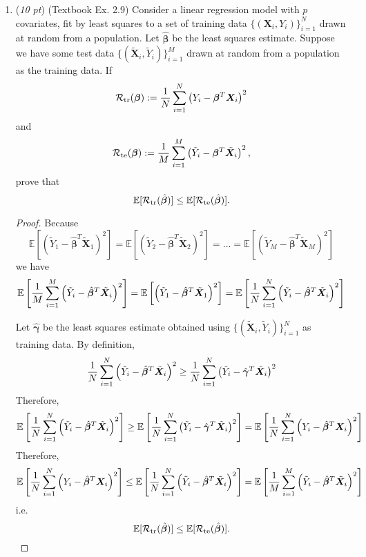 \documentclass[10pt]{article}
\theoremstyle{definition}
\theoremstyle{remark}
\newcommand{\bX}{\bm{X}}
\newcommand{\bbeta}{\bm{\beta}}
\newcommand{\bgamma}{\bm{\gamma}}
\newcommand{\bbE}{\mathbb{E}}
\newcommand{\cR}{\mathcal{R}}
\begin{document}
\begin{enumerate}
	\item (\textit{10 pt}) (Textbook Ex. 2.9) Consider a linear regression model with $ p $ covariates, fit by least squares to a set of training data $ \{ (\bX_{i},Y_{i}) \}_{i=1}^{N} $ drawn at random from a population. Let $ \hat{\bbeta} $ be the least squares estimate. Suppose we have some test data $ \{ (\tilde{\bX}_{i},\tilde{Y}_{i}) \}_{i=1}^{M} $ drawn at random from a population as the training data. If
	\[ \cR_{\rm tr}(\bbeta) := {1 \over N}\sum_{i=1}^{N}\left( Y_{i} - \bbeta^{T}\bX_{i} \right)^{2} \]
	and
	\[ \cR_{\rm te}(\bbeta) := {1 \over M}\sum_{i=1}^{M}\left( \tilde{Y}_{i} - \bbeta^{T}\tilde{\bX}_{i} \right)^{2}, \]
	prove that
	\[ \bbE[\cR_{\rm tr}(\hat{\bbeta})] \le \bbE [\cR_{\rm te}(\hat{\bbeta})]. \]
	
	\begin{proof}
	Because \[ \bbE\left[\left( \tilde{Y}_{1} - \hat{\bbeta}^{T}\tilde{\bX}_{1} \right)^{2}\right] = \bbE\left[\left( \tilde{Y}_{2} - \hat{\bbeta}^{T}\tilde{\bX}_{2} \right)^{2}\right] = \hdots = \bbE\left[\left( \tilde{Y}_{M} - \hat{\bbeta}^{T}\tilde{\bX}_{M} \right)^{2}\right] \]
	we have \[ \bbE\left[{1 \over M}\sum_{i=1}^{M}\left( \tilde{Y}_{i} - \hat{\bbeta}^{T}\tilde{\bX}_{i} \right)^{2}\right] = \bbE\left[\left( \tilde{Y}_{1} - \hat{\bbeta}^{T}\tilde{\bX}_{1} \right)^{2}\right] = \bbE\left[{1 \over N}\sum_{i=1}^{N}\left( \tilde{Y}_{i} - \hat{\bbeta}^{T}\tilde{\bX}_{i} \right)^{2}\right] \]
	
	Let $\hat{\bgamma}$ be the least squares estimate obtained using $\{ (\tilde{\bX}_{i},\tilde{Y}_{i}) \}_{i=1}^{N}$ as training data.
	By definition,
	\[
	{1 \over N}\sum_{i=1}^{N}\left( \tilde{Y}_{i} - \hat{\bbeta}^{T}\tilde{\bX}_{i} \right)^{2} 
	\ge
	{1 \over N}\sum_{i=1}^{N}\left( \tilde{Y}_{i} - \hat{\bgamma}^{T}\tilde{\bX}_{i} \right)^{2} 
	\]
	Therefore, 
	\[
	\bbE\left[{1 \over N}\sum_{i=1}^{N}\left( \tilde{Y}_{i} - \hat{\bbeta}^{T}\tilde{\bX}_{i} \right)^{2} \right]
	\ge
	\bbE\left[{1 \over N}\sum_{i=1}^{N}\left( \tilde{Y}_{i} - \hat{\bgamma}^{T}\tilde{\bX}_{i} \right)^{2} \right] = \bbE\left[{1 \over N}\sum_{i=1}^{N}\left( Y_{i} - \hat{\bbeta}^{T}\bX_{i} \right)^{2} \right]
	\]
	Therefore,
	\[
	\bbE\left[{1 \over N}\sum_{i=1}^{N}\left( Y_{i} - \hat{\bbeta}^{T}\bX_{i} \right)^{2} \right]
	\le
	\bbE\left[{1 \over N}\sum_{i=1}^{N}\left( \tilde{Y}_{i} - \hat{\bbeta}^{T}\tilde{\bX}_{i} \right)^{2} \right] = \bbE\left[{1 \over M}\sum_{i=1}^{M}\left( \tilde{Y}_{i} - \hat{\bbeta}^{T}\tilde{\bX}_{i} \right)^{2}\right]
	\]
	i.e.
	\[
	\bbE[\cR_{\rm tr}(\hat{\bbeta})] \le \bbE [\cR_{\rm te}(\hat{\bbeta})].
	\]
	\end{proof}
	

\end{enumerate}
\end{document}
